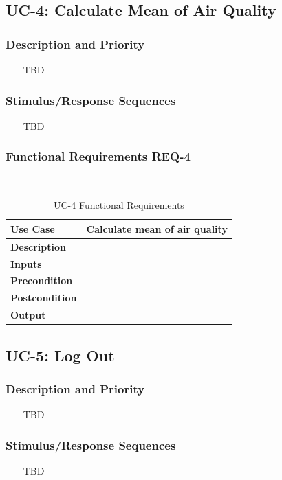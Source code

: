 \documentclass{report}
\begin{document}
\subsection{UC-4: Calculate Mean of Air Quality}

\subsubsection*{Description and Priority} ~~~
TBD

\subsubsection*{Stimulus/Response Sequences} ~~~
TBD

\subsubsection*{Functional Requirements REQ-4} ~~~
\begin{table}[H]
	\begin{center}
		\begin{tabular}{|m{4cm}|m{10cm}|}
		\hline
		\textbf{Use Case} & Calculate mean of air quality \\
		\hline
		\textbf{Description} &  \\
		\hline
		\textbf{Inputs} &  \\
		\hline
		\textbf{Precondition} &  \\
		\hline
		\textbf{Postcondition} &  \\
		\hline
		\textbf{Output} &  \\
		\hline
		\end{tabular}
	\end{center}
	\caption{UC-4 Functional Requirements}
	\label{table:REQ-4}
\end{table}

\subsection{UC-5: Log Out}

\subsubsection*{Description and Priority} ~~~
TBD

\subsubsection*{Stimulus/Response Sequences} ~~~
TBD
\end{document}
